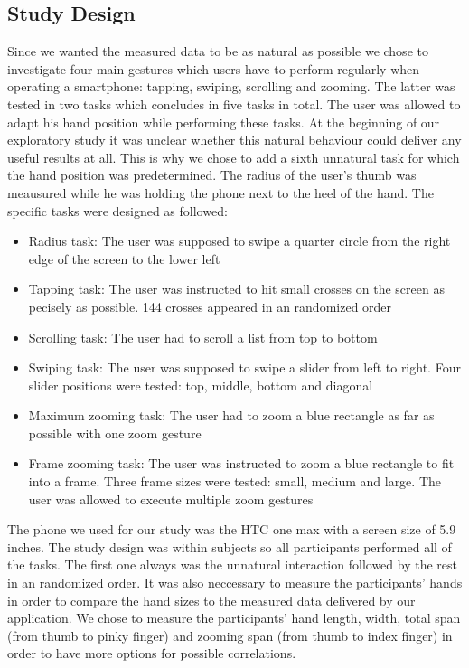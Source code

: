 \documentclass{sigchi}
\begin{document}
\subsection{Study Design}
Since we wanted the measured data to be as natural as possible we chose to investigate four main gestures which users have to perform regularly when operating a smartphone: tapping, swiping, scrolling and zooming. The latter was tested in two tasks which concludes in five tasks in total. The user was allowed to adapt his hand position while performing these tasks. At the beginning of our exploratory study it was unclear whether this natural behaviour could deliver any useful results at all. This is why we chose to add a sixth unnatural task for which the hand position was predetermined. The radius of the user's thumb was meausured while he was holding the phone next to the heel of the hand. The specific tasks were designed as followed:
\begin{itemize}
	\item{Radius task:} The user was supposed to swipe a quarter circle from the right edge of the screen to the lower left
	\item{Tapping task:} The user was instructed to hit small crosses on the screen as pecisely as possible. 144 crosses appeared in an randomized order
	\item{Scrolling task:} The user had to scroll a list from top to bottom
	\item{Swiping task:} The user was supposed to swipe a slider from left to right. Four slider positions were tested: top, middle, bottom and diagonal
	\item{Maximum zooming task:} The user had to zoom a blue rectangle as far as possible with one zoom gesture
	\item{Frame zooming task:} The user was instructed to zoom a blue rectangle to fit into a frame. Three frame sizes were tested: small, medium and large. The user was allowed to execute multiple zoom gestures
\end{itemize}The phone we used for our study was the HTC one max with a screen size of 5.9 inches. The study design was within subjects so all participants performed all of the tasks. The first one always was the unnatural interaction followed by the rest in an randomized order. It was also neccessary to measure the participants' hands in order to compare the hand sizes to the measured data delivered by our application. We chose to measure the participants' hand length, width, total span (from thumb to pinky finger) and zooming span (from thumb to index finger) in order to have more options for possible correlations. 
\end{document}
